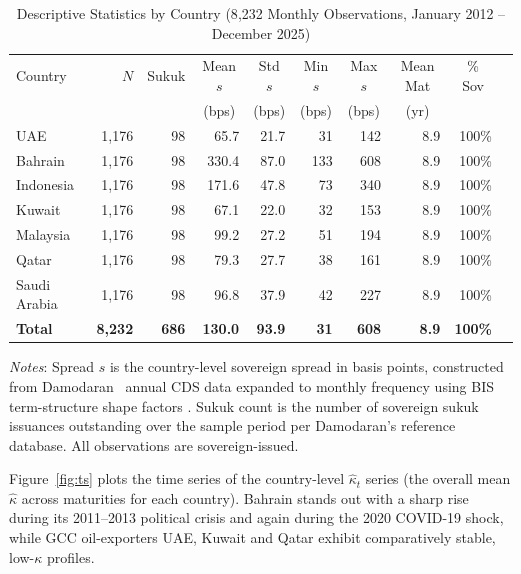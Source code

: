 \documentclass[12pt]{article}
\theoremstyle{plain}
\theoremstyle{definition}
\theoremstyle{remark}
\begin{document}
\begin{table}[htbp]
  \centering
  \caption{Descriptive Statistics by Country
    (8{,}232 Monthly Observations, January 2012 -- December 2025)}
  \label{tab:desc}
  \small
  \begin{tabular}{lrrrrrrrrr}
    \toprule
    Country & $N$ & Sukuk & \multicolumn{1}{c}{Mean $s$} &
      \multicolumn{1}{c}{Std $s$} & \multicolumn{1}{c}{Min $s$} &
      \multicolumn{1}{c}{Max $s$} & \multicolumn{1}{c}{Mean Mat} &
      \multicolumn{1}{c}{\% Sov} \\
    & & & \multicolumn{1}{c}{(bps)} & \multicolumn{1}{c}{(bps)} &
      \multicolumn{1}{c}{(bps)} & \multicolumn{1}{c}{(bps)} &
      \multicolumn{1}{c}{(yr)} & \\
    \midrule
    UAE          & 1,176 & 98 & 65.7  & 21.7 & 31  & 142 & 8.9 & 100\% \\
    Bahrain      & 1,176 & 98 & 330.4 & 87.0 & 133 & 608 & 8.9 & 100\% \\
    Indonesia    & 1,176 & 98 & 171.6 & 47.8 & 73  & 340 & 8.9 & 100\% \\
    Kuwait       & 1,176 & 98 & 67.1  & 22.0 & 32  & 153 & 8.9 & 100\% \\
    Malaysia     & 1,176 & 98 & 99.2  & 27.2 & 51  & 194 & 8.9 & 100\% \\
    Qatar        & 1,176 & 98 & 79.3  & 27.7 & 38  & 161 & 8.9 & 100\% \\
    Saudi Arabia & 1,176 & 98 & 96.8  & 37.9 & 42  & 227 & 8.9 & 100\% \\
    \midrule
    \textbf{Total} & \textbf{8,232} & \textbf{686} & \textbf{130.0} &
      \textbf{93.9} & \textbf{31} & \textbf{608} & \textbf{8.9} &
      \textbf{100\%} \\
    \bottomrule
  \end{tabular}
  \begin{minipage}{\textwidth}
    \smallskip
    \footnotesize
    \textit{Notes}: Spread $s$ is the country-level sovereign spread in basis
    points, constructed from Damodaran~\cite{Damodaran2026} annual CDS data
    expanded to monthly frequency using BIS term-structure shape factors
    \cite{BIS2022}. Sukuk count is the number of sovereign sukuk issuances
    outstanding over the sample period per Damodaran's reference database.
    All observations are sovereign-issued.
  \end{minipage}
\end{table}

Figure~\ref{fig:ts} plots the time series of the country-level
$\hat{\kappa}_t$ series (the overall mean $\hat{\kappa}$ across maturities for
each country). Bahrain stands out with a sharp rise during its 2011--2013
political crisis and again during the 2020 COVID-19 shock, while GCC
oil-exporters UAE, Kuwait and Qatar exhibit comparatively stable,
low-$\kappa$ profiles.
\end{document}
